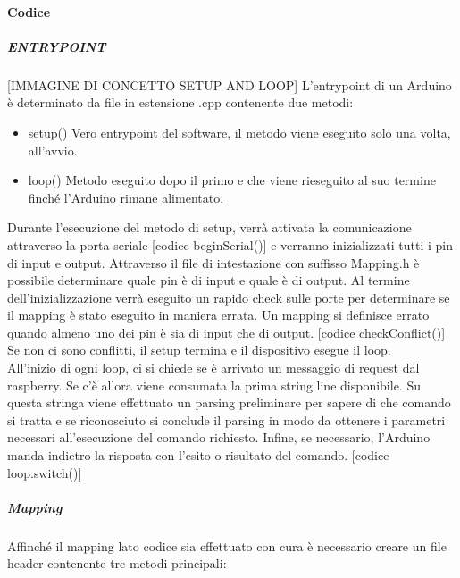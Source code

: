 \documentclass[12pt]{article}
\begin{document}
\paragraph{Codice}
\subparagraph{ENTRYPOINT}
[IMMAGINE DI CONCETTO SETUP AND LOOP]
L'entrypoint di un Arduino è determinato da file in estensione .cpp contenente due metodi:
\begin{itemize}
\item setup() Vero entrypoint del software, il metodo viene eseguito solo una volta, all'avvio.
\item loop() Metodo eseguito dopo il primo e che viene rieseguito al suo termine finché l'Arduino rimane alimentato.
\end{itemize}
Durante l'esecuzione del metodo di setup, verrà attivata la comunicazione attraverso la porta seriale [codice beginSerial()] e verranno inizializzati tutti i pin di input e output. Attraverso il file di intestazione con suffisso Mapping.h è possibile determinare quale pin è di input e quale è di output.
Al termine dell'inizializzazione verrà eseguito un rapido check sulle porte per determinare se il mapping è stato eseguito in maniera errata. Un mapping si definisce errato quando almeno uno dei pin è sia di input che di output.
[codice checkConflict()]
Se non ci sono conflitti, il setup termina e il dispositivo esegue il loop.\\
All'inizio di ogni loop, ci si chiede se è arrivato un messaggio di request dal raspberry. Se c'è allora viene consumata la prima string line disponibile. Su questa stringa viene effettuato un parsing preliminare per sapere di che comando si tratta e se riconosciuto si conclude il parsing in modo da ottenere i parametri necessari all'esecuzione del comando richiesto. Infine, se necessario, l'Arduino manda indietro la risposta con l'esito o risultato del comando. [codice loop.switch()]
\subparagraph{Mapping}
Affinché il mapping lato codice sia effettuato con cura è necessario creare un file header contenente tre metodi principali:
\end{document}
